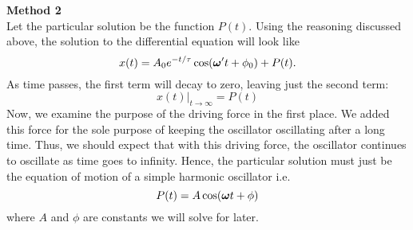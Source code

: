 \noindent \textbf{Method 2} \\
\noindent Let the particular solution be the function $P(t)$. Using the reasoning discussed above, the solution to the differential equation will look like
\begin{equation*}
    x(t) = A_0e^{-t/\tau}\cos(\boldsymbol{\omega}' t + \phi_0) + P(t).
\end{equation*}
\noindent As time passes, the first term will decay to zero, leaving just the second term:
\begin{equation*}
    x(t)|_{t\rightarrow\infty} = P(t)
\end{equation*}
\noindent Now, we examine the purpose of the driving force in the first place. We added this force for the sole purpose of keeping the oscillator oscillating after a long time. Thus, we should expect that with this driving force, the oscillator continues to oscillate as time goes to infinity. Hence, the particular solution must just be the equation of motion of a simple harmonic oscillator i.e.
\begin{equation*}
    P(t) = A\cos(\boldsymbol{\omega} t + \phi)
\end{equation*}
\noindent where $A$ and $\phi$ are constants we will solve for later.

